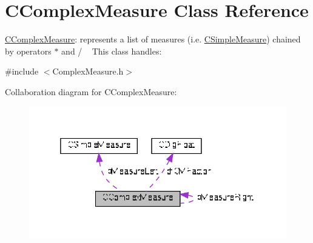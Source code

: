 \hypertarget{classCComplexMeasure}{}\section{C\+Complex\+Measure Class Reference}
\label{classCComplexMeasure}


\hyperlink{classCComplexMeasure}{C\+Complex\+Measure}\+: represents a list of measures (i.\+e. \hyperlink{classCSimpleMeasure}{C\+Simple\+Measure}) chained by operators $\ast$ and / ~\newline
 This class handles\+:  




{\ttfamily \#include $<$Complex\+Measure.\+h$>$}



Collaboration diagram for C\+Complex\+Measure\+:
\nopagebreak
\begin{figure}[H]
\begin{center}
\leavevmode
\includegraphics[width=325pt]{d6/d10/classCComplexMeasure__coll__graph}
\end{center}
\end{figure}
